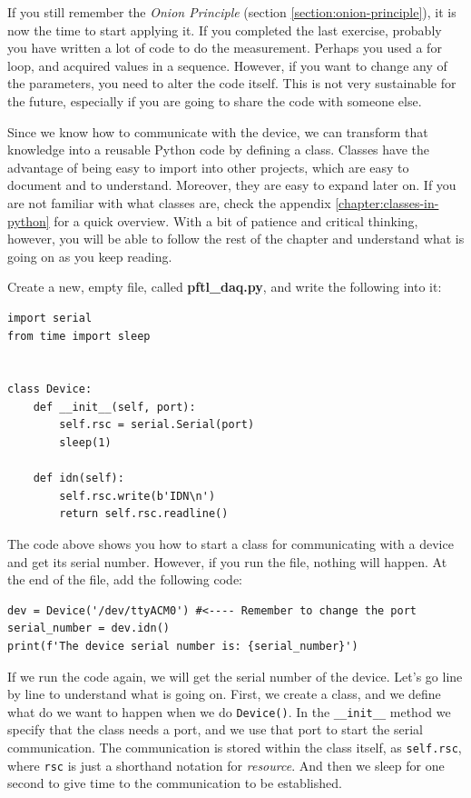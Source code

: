 If you still remember the \emph{Onion Principle} (section \ref{section:onion-principle}), it is now the time to start applying it. If you completed the last exercise, probably you have written a lot of code to do the measurement. Perhaps you used a for loop, and acquired values in a sequence. However, if you want to change any of the parameters, you need to alter the code itself. This is not very sustainable for the future, especially if you are going to share the code with someone else.

Since we know how to communicate with the device, we can transform that knowledge into a reusable Python code by defining a class. Classes have the advantage of being easy to import into other projects, which are easy to document and to understand. Moreover, they are easy to expand later on. If you are not familiar with what classes are, check the appendix \ref{chapter:classes-in-python} for a quick overview. With a bit of patience and critical thinking, however, you will be able to follow the rest of the chapter and understand what is going on as you keep reading.

Create a new, empty file, called \textbf{pftl\_daq.py}, and write the following into it:

\begin{verbatim}
import serial
from time import sleep


class Device:
    def __init__(self, port):
        self.rsc = serial.Serial(port)
        sleep(1)

    def idn(self):
        self.rsc.write(b'IDN\n')
        return self.rsc.readline()

\end{verbatim}

The code above shows you how to start a class for communicating with a device and get its serial number. However, if you run the file, nothing will happen. At the end of the file, add the following code:

\begin{verbatim}
dev = Device('/dev/ttyACM0') #<---- Remember to change the port
serial_number = dev.idn()
print(f'The device serial number is: {serial_number}')
\end{verbatim}

If we run the code again, we will get the serial number of the device. Let's go line by line to understand what is going on. First, we create a class, and we define what do we want to happen when we do \texttt{Device()}. In the \texttt{\_\_init\_\_} method we specify that the class needs a port, and we use that port to start the serial communication. The communication is stored within the class itself, as \texttt{self.rsc}, where \texttt{rsc} is just a shorthand notation for \textit{resource}. And then we sleep for one second to give time to the communication to be established.

